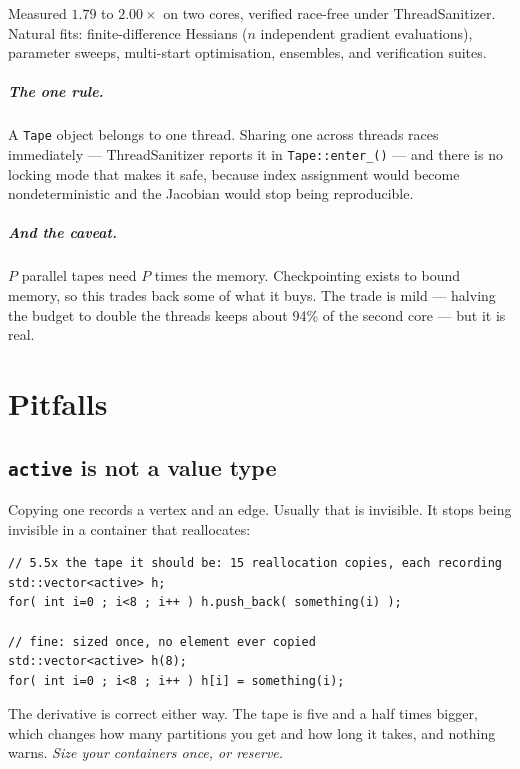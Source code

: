 \documentclass[11pt,a4paper]{report}
\newcommand{\code}[1]{\texttt{#1}}
\begin{document}
Measured $1.79$ to $2.00\times$ on two cores, verified race-free under
ThreadSanitizer. Natural fits: finite-difference Hessians ($n$ independent
gradient evaluations), parameter sweeps, multi-start optimisation, ensembles,
and verification suites.

\paragraph{The one rule.} A \code{Tape} object belongs to one thread. Sharing
one across threads races immediately --- ThreadSanitizer reports it in
\code{Tape::enter\_()} --- and there is no locking mode that makes it safe,
because index assignment would become nondeterministic and the Jacobian would
stop being reproducible.

\paragraph{And the caveat.} $P$ parallel tapes need $P$ times the memory.
Checkpointing exists to bound memory, so this trades back some of what it buys.
The trade is mild --- halving the budget to double the threads keeps about 94\%
of the second core --- but it is real.

\chapter{Pitfalls}
\label{sec:pitfalls}

\section{\code{active} is not a value type}

Copying one records a vertex and an edge. Usually that is invisible. It stops
being invisible in a container that reallocates:

\begin{lstlisting}
// 5.5x the tape it should be: 15 reallocation copies, each recording
std::vector<active> h;
for( int i=0 ; i<8 ; i++ ) h.push_back( something(i) );

// fine: sized once, no element ever copied
std::vector<active> h(8);
for( int i=0 ; i<8 ; i++ ) h[i] = something(i);
\end{lstlisting}

\noindent
The derivative is correct either way. The tape is five and a half times bigger,
which changes how many partitions you get and how long it takes, and nothing
warns. \emph{Size your containers once, or reserve.}
\end{document}
